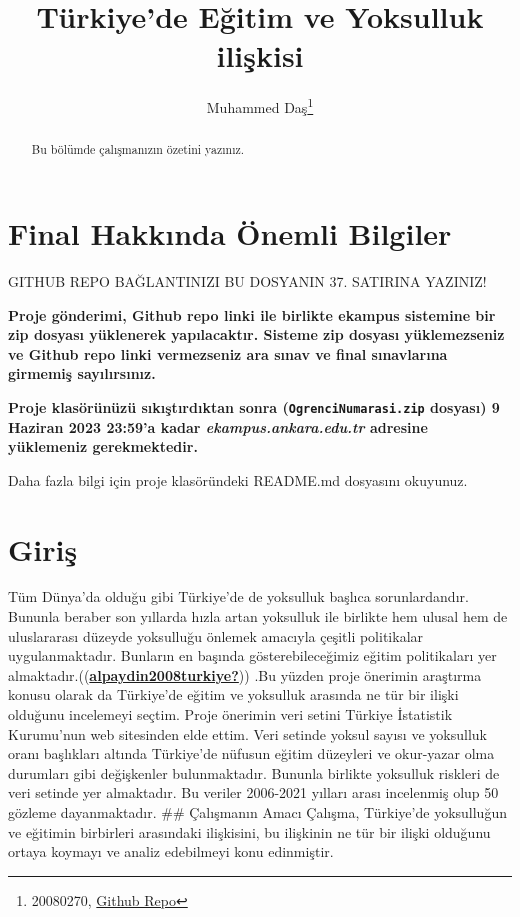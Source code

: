 \documentclass[
  12pt,
]{article}
\title{Türkiye'de Eğitim ve Yoksulluk ilişkisi}
\author{Muhammed Daş\footnote{20080270, \href{https://github.com/muhammedddas/deneme.git/muhammedddas/deneme}{Github Repo}}}
\date{}
\begin{document}
\maketitle
\begin{abstract}
Bu bölümde çalışmanızın özetini yazınız.
\end{abstract}

\hypertarget{final-hakkux131nda-uxf6nemli-bilgiler}{%
\section{Final Hakkında Önemli Bilgiler}\label{final-hakkux131nda-uxf6nemli-bilgiler}}

\colorbox{BurntOrange}{GITHUB REPO BAĞLANTINIZI BU DOSYANIN 37. SATIRINA YAZINIZ!}

\textbf{Proje gönderimi, Github repo linki ile birlikte ekampus sistemine bir zip dosyası yüklenerek yapılacaktır. Sisteme zip dosyası yüklemezseniz ve Github repo linki vermezseniz ara sınav ve final sınavlarına girmemiş sayılırsınız.}

\textbf{Proje klasörünüzü sıkıştırdıktan sonra (\texttt{OgrenciNumarasi.zip} dosyası) 9 Haziran 2023 23:59'a kadar \emph{ekampus.ankara.edu.tr} adresine yüklemeniz gerekmektedir.}

\colorbox{WildStrawberry}{Daha fazla bilgi için proje klasöründeki README.md dosyasını okuyunuz.}

\hypertarget{giriux15f}{%
\section{Giriş}\label{giriux15f}}

Tüm Dünya'da olduğu gibi Türkiye'de de yoksulluk başlıca sorunlardandır. Bununla beraber son yıllarda hızla artan yoksulluk ile birlikte hem ulusal hem de uluslararası düzeyde yoksulluğu önlemek amacıyla çeşitli politikalar uygulanmaktadır. Bunların en başında gösterebileceğimiz eğitim politikaları yer almaktadır.((\protect\hyperlink{ref-alpaydin2008turkiye}{\textbf{alpaydin2008turkiye?}})) .Bu yüzden proje önerimin araştırma konusu olarak da Türkiye'de eğitim ve yoksulluk arasında ne tür bir ilişki olduğunu incelemeyi seçtim. Proje önerimin veri setini Türkiye İstatistik Kurumu'nun web sitesinden elde ettim. Veri setinde yoksul sayısı ve yoksulluk oranı başlıkları altında Türkiye'de nüfusun eğitim düzeyleri ve okur-yazar olma durumları gibi değişkenler bulunmaktadır. Bununla birlikte yoksulluk riskleri de veri setinde yer almaktadır. Bu veriler 2006-2021 yılları arası incelenmiş olup 50 gözleme dayanmaktadır.
\#\# Çalışmanın Amacı
Çalışma, Türkiye'de yoksulluğun ve eğitimin birbirleri arasındaki ilişkisini, bu ilişkinin ne tür bir ilişki olduğunu ortaya koymayı ve analiz edebilmeyi konu edinmiştir.
\end{document}
